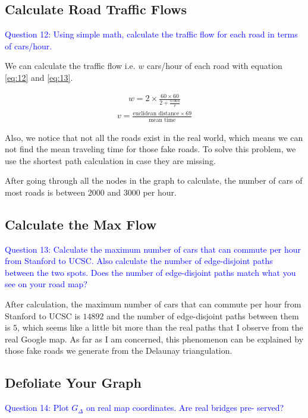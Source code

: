 \documentclass[11pt]{article}
\begin{document}
\subsection{Calculate Road Traffic Flows}

\textcolor{blue}{
Question 12: Using simple math, calculate the traffic flow for each road in terms of cars/hour.
}

We can calculate the traffic flow i.e. $w$ cars/hour of each road with equation \eqref{eq:12} and \eqref{eq:13}.

\begin{align}
w = 2 \times \frac{60 \times 60}{2 + \frac{0.003}{v}}\label{eq:12}
\end{align}
\begin{align}
v = \frac{ \text{euclidean distance} \times 69}{ \text{mean time}}\label{eq:13}
\end{align}

Also, we notice that not all the roads exist in the real world, which means we can not find the mean traveling time for those fake roads. To solve this problem, we use the shortest path calculation in case they are missing.

After going through all the nodes in the graph to calculate, the number of cars of most roads is between 2000 and 3000 per hour.

\subsection{Calculate the Max Flow}
\textcolor{blue}{
Question 13: Calculate the maximum number of cars that can commute per hour from Stanford to UCSC. Also calculate the number of edge-disjoint paths between the two spots. Does the number of edge-disjoint paths match what you see on your road map?
}

After calculation, the maximum number of cars that can commute per hour from Stanford to UCSC is $14892$ and the number of edge-disjoint paths between them is $5$, which seems like a little bit more than the real paths that I observe from the real Google map. As far as I am concerned, this phenomenon can be explained by those fake roads we generate from the Delaunay triangulation.

\subsection{Defoliate Your Graph}
\textcolor{blue}{
Question 14: Plot $G_{\Delta}$ on real map coordinates. Are real bridges pre- served?
}
\end{document}
